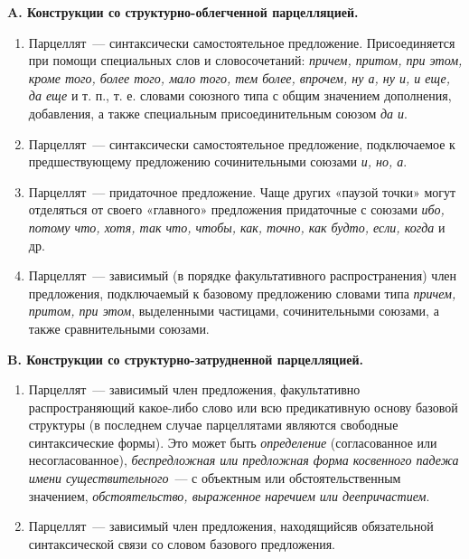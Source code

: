 \documentclass{kursa4}
\begin{document}
      {\centering
      \textbf{A. Конструкции со структурно-облегченной
      парцелляцией.}}
      \begin{enumerate}
        \item Парцеллят~--- синтаксически самостоятельное
        предложение. Присоединяется при помощи специальных слов и
        словосочетаний: \textit{причем, притом, при этом,
        кроме того, более того, мало того, тем более, впрочем, ну а, ну и, и
        еще, да еще} и т. п., т. е. словами союзного типа с общим значением дополнения, добавления, а также специальным присоединительным союзом \textit{да и}.
        \item Парцеллят~--- синтаксически самостоятельное
        предложение, подключаемое к предшествующему предложению сочинительными
        союзами \textit{и, но, а}.
        \item Парцеллят~--- придаточное предложение. Чаще других
        «паузой точки» могут отделяться от своего «главного» предложения
        придаточные с союзами \textit{ибо, потому что, хотя,
        так что, чтобы, как, точно, как будто, если, когда}
        и др.
        \item Парцеллят~--- зависимый (в порядке факультативного распространения) член предложения, подключаемый к
        базовому предложению словами типа \textit{причем,
        притом, при этом}, выделенными частицами,
        сочинительными союзами, а также сравнительными союзами.
      \end{enumerate}

      {\centering\textbf{B. Конструкции со структурно-затрудненной парцелляцией.}}
      \begin{enumerate}
        \item {Парцеллят~--- зависимый член предложения,
        факультативно распространяющий какое-либо слово или всю предикативную
        основу базовой структуры (в последнем случае парцеллятами являются
        свободные синтаксические формы). Это может быть
        }\textit{определение}
        (согласованное или несогласованное), \textit{беспредложная или предложная форма
        косвенного падежа имени существительного}~--- с
        объектным или обстоятельственным значением,
        \textit{обстоятельство, выраженное наречием или
        деепричастием}.
        \item {Парцеллят~--- зависимый член предложения,
        находящийся}в обязательной
        синтаксической связи со словом базового предложения.
      \end{enumerate}
\end{document}
